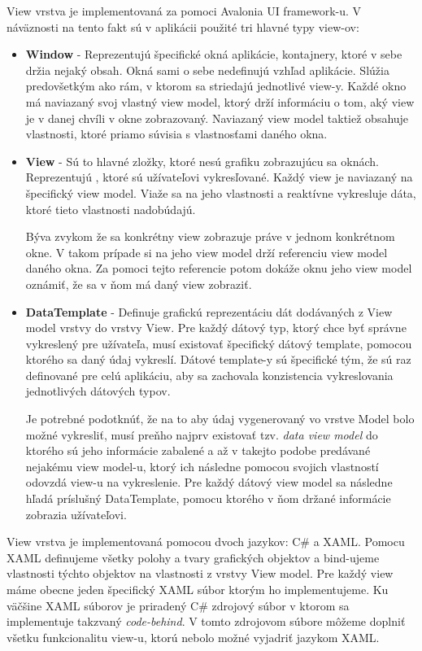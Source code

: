 View vrstva je implementovaná za pomoci Avalonia UI framework-u. V náväznosti na tento fakt sú v aplikácii použité tri hlavné typy view-ov:
\begin{itemize}
    \item \textbf{Window} - Reprezentujú špecifické okná aplikácie,  kontajnery, ktoré v sebe držia nejaký obsah. Okná sami o sebe nedefinujú vzhľad aplikácie. Slúžia predovšetkým ako rám, v ktorom sa striedajú jednotlivé view-y. Každé okno má naviazaný svoj vlastný view model, ktorý drží informáciu o tom, aký view je v danej chvíli v okne zobrazovaný. Naviazaný view model taktiež obsahuje vlastnosti, ktoré priamo súvisia s vlastnosťami daného okna.
    \item \textbf{View} - Sú to hlavné zložky, ktoré nesú grafiku zobrazujúcu sa oknách. Reprezentujú , ktoré sú užívateľovi vykresľované. Každý view je naviazaný na špecifický view model. Viaže sa na jeho vlastnosti a reaktívne vykresluje dáta, ktoré tieto vlastnosti nadobúdajú. 
    
    Býva zvykom že sa konkrétny view zobrazuje práve v jednom konkrétnom okne. V takom prípade si na jeho view model drží referenciu view model daného okna. Za pomoci tejto referencie potom dokáže oknu jeho view model oznámiť, že sa v ňom má daný view zobraziť. 
    \item \textbf{DataTemplate} - Definuje grafickú reprezentáciu dát dodávaných z View model vrstvy do vrstvy View. Pre každý dátový typ, ktorý chce byť správne vykreslený pre užívateľa, musí existovať špecifický dátový template, pomocou ktorého sa daný údaj vykreslí. Dátové template-y sú špecifické tým, že sú raz definované pre celú aplikáciu, aby sa zachovala konzistencia vykreslovania jednotlivých dátových typov.
    
    Je potrebné podotknúť, že na to aby údaj vygenerovaný vo vrstve Model bolo možné vykresliť, musí preňho najprv existovať tzv. \textit{data view model} do ktorého sú jeho informácie zabalené a až v takejto podobe predávané nejakému view model-u, ktorý ich následne pomocou svojich vlastností odovzdá view-u na vykreslenie. Pre každý dátový view model sa následne hľadá príslušný DataTemplate, pomocu ktorého v ňom držané informácie zobrazia užívateľovi. 
\end{itemize}   

View vrstva je implementovaná pomocou dvoch jazykov: C\# a XAML. Pomocu XAML definujeme všetky polohy a tvary grafických objektov a bind-ujeme vlastnosti týchto objektov na vlastnosti z vrstvy View model. Pre každý view máme obecne jeden špecifický XAML súbor ktorým ho implementujeme. Ku väčšine XAML súborov je priradený C\# zdrojový súbor v ktorom sa implementuje takzvaný \textit{code-behind}. V tomto zdrojovom súbore môžeme doplniť všetku funkcionalitu view-u, ktorú nebolo možné vyjadriť jazykom XAML.    

